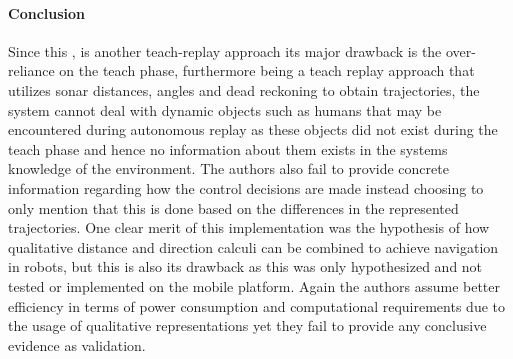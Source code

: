	\paragraph{Conclusion}Since this \cite{musto1999qualitative}, is another teach-replay approach its major drawback is the over-reliance on the teach phase, furthermore being a teach replay approach that utilizes sonar distances, angles and dead reckoning to obtain trajectories, the system cannot deal with dynamic objects such as humans that may be encountered during autonomous replay as these objects did not exist during the teach phase and hence no information about them exists in the systems knowledge of the environment. The authors also fail to provide concrete information regarding how the control decisions are made instead choosing to only mention that this is done based on the differences in the represented trajectories. One clear merit of this implementation was the hypothesis of how qualitative distance and direction calculi can be combined to achieve navigation in robots, but this is also its drawback as this was only hypothesized and not tested or implemented on the mobile platform. Again the authors assume better efficiency in terms of power consumption and computational requirements due to the usage of qualitative representations yet they fail to provide any conclusive evidence as validation.

